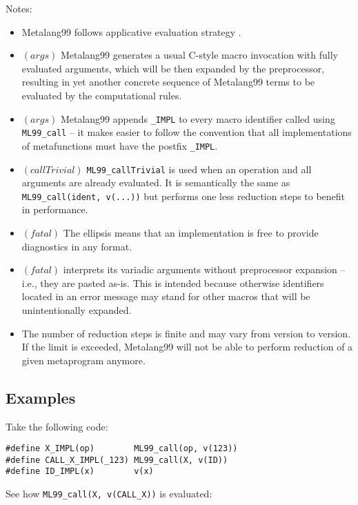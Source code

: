 \documentclass[12pt]{article}
\theoremstyle{break}
\begin{document}
Notes:

\begin{itemize}
    \item Metalang99 follows applicative evaluation strategy \cite{ApplicativeEvaluationStrategy}.

    \item $(args)$ Metalang99 generates a usual C-style macro invocation with
    fully evaluated arguments, which will be then expanded by the preprocessor, resulting
    in yet another concrete sequence of Metalang99 terms to be evaluated by the computational
    rules.
    \item $(args)$ Metalang99 appends \texttt{\_IMPL} to every macro identifier called using
    \texttt{ML99\_call} -- it makes easier to follow the convention that all implementations
    of metafunctions must have the postfix \texttt{\_IMPL}.
    \item $(callTrivial)$ \texttt{ML99\_callTrivial} is used when an operation and all
    arguments are already evaluated. It is semantically the same as \\ \texttt{ML99\_call(ident, v(...))}
    but performs one less reduction steps to benefit in performance.
    \item $(fatal)$ The ellipsis means that an implementation is free to provide
    diagnostics in any format.
    \item $(fatal)$ interprets its variadic arguments without preprocessor expansion -- i.e.,
    they are pasted as-is. This is intended because otherwise identifiers located in an
    error message may stand for other macros that will be unintentionally expanded.
    \item The number of reduction steps is finite and may vary from version to version. If
    the limit is exceeded, Metalang99 will not be able to perform reduction of a given
    metaprogram anymore.
\end{itemize}

\subsection{Examples}

Take the following code:

\begin{verbatim}
#define X_IMPL(op)        ML99_call(op, v(123))
#define CALL_X_IMPL(_123) ML99_call(X, v(ID))
#define ID_IMPL(x)        v(x)
\end{verbatim}

See how \texttt{ML99\_call(X, v(CALL\_X))} is evaluated:
\end{document}

